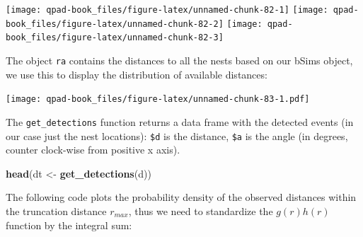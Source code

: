\documentclass[12pt,]{book}
\newenvironment{Shaded}{\begin{snugshade}}{\end{snugshade}}
\newcommand{\DataTypeTok}[1]{\textcolor[rgb]{0.13,0.29,0.53}{#1}}
\newcommand{\DecValTok}[1]{\textcolor[rgb]{0.00,0.00,0.81}{#1}}
\newcommand{\KeywordTok}[1]{\textcolor[rgb]{0.13,0.29,0.53}{\textbf{#1}}}
\newcommand{\NormalTok}[1]{#1}
\newcommand{\OperatorTok}[1]{\textcolor[rgb]{0.81,0.36,0.00}{\textbf{#1}}}
\newcommand{\OtherTok}[1]{\textcolor[rgb]{0.56,0.35,0.01}{#1}}
\newcommand{\StringTok}[1]{\textcolor[rgb]{0.31,0.60,0.02}{#1}}
\begin{document}
\texttt{[image: qpad-book\_files/figure-latex/unnamed-chunk-82-1]} \texttt{[image: qpad-book\_files/figure-latex/unnamed-chunk-82-2]} \texttt{[image: qpad-book\_files/figure-latex/unnamed-chunk-82-3]}

The object \texttt{ra} contains the distances to all the nests
based on our bSims object,
we use this to display the distribution of available distances:

\begin{Shaded}
\end{Shaded}

\texttt{[image: qpad-book\_files/figure-latex/unnamed-chunk-83-1.pdf]}

The \texttt{get\_detections} function returns a data frame with the
detected events (in our case just the nest locations):
\texttt{\$d} is the distance, \texttt{\$a} is the angle
(in degrees, counter clock-wise from positive x axis).

\begin{Shaded}
\begin{Highlighting}[]
\KeywordTok{head}\NormalTok{(dt <-}\StringTok{ }\KeywordTok{get_detections}\NormalTok{(d))}
\end{Highlighting}
\end{Shaded}

The following code plots the probability density of the
observed distances within the truncation distance \(r_{max}\),
thus we need to standardize the \(g(r) h(r)\) function
by the integral sum:
\end{document}
